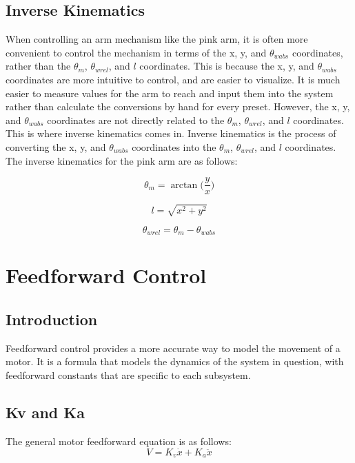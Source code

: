 \documentclass{scrartcl}
\begin{document}
\subsection{Inverse Kinematics}
When controlling an arm mechanism like the pink arm, it is often more convenient to control the mechanism in terms of the x, y, and \(\theta_{wabs}\) coordinates, rather than the \(\theta_m\), \(\theta_{wrel}\), and \(l\) coordinates. This is because the x, y, and \(\theta_{wabs}\) coordinates are more intuitive to control, and are easier to visualize. It is much easier to measure values for the arm to reach and input them into the system rather than calculate the conversions by hand for every preset. However, the x, y, and \(\theta_{wabs}\) coordinates are not directly related to the \(\theta_m\), \(\theta_{wrel}\), and \(l\) coordinates. This is where inverse kinematics comes in. Inverse kinematics is the process of converting the x, y, and \(\theta_{wabs}\) coordinates into the \(\theta_m\), \(\theta_{wrel}\), and \(l\) coordinates. The inverse kinematics for the pink arm are as follows:

\begin{equation} \label{theta_m}
    \theta_m = \arctan\biggl(\frac{y}{x}\biggl)
\end{equation}

\begin{equation} \label{l}
    l = \sqrt{x^2 + y^2}
\end{equation}

\begin{equation} \label{theta_wrel}
    \theta_{wrel} = \theta_m - \theta_{wabs}
\end{equation}

\section{Feedforward Control}

\subsection{Introduction}
Feedforward control provides a more accurate way to model the movement of a motor. It is a formula that models the dynamics of the system in question, with feedforward constants that are specific to each subsystem.

\subsection{Kv and Ka}
The general motor feedforward equation is as follows:
\begin{equation} \label{Motor Feedforward Equation}
    V = K_v \dot{x} + K_a \ddot{x}
\end{equation}
\end{document}
